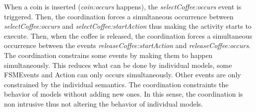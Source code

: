 When a coin is inserted (\emph{coin:occurs} happens), the \emph{selectCoffee:occurs} event is triggered. Then, the coordination forces a simultaneous occurrence between \emph{selectCoffee:occurs} and \emph{selectCoffee:startAction} thus making the activity starts to execute. Then, when the coffee is released, the coordination forces a simultaneous occurrence between the events \emph{releaseCoffee:startAction} and \emph{releaseCoffee:occurs}. The coordination constrains some events by making them to happen simultaneously. This reduces what can be done by individual models, \ie some FSMEvents and Action can only occurs simultaneously. Other events are only constrained by the individual semantics. The coordination constraints the behavior of models without adding new ones. In this sense, the coordination is non intrusive thus not altering the behavior of individual models. 


